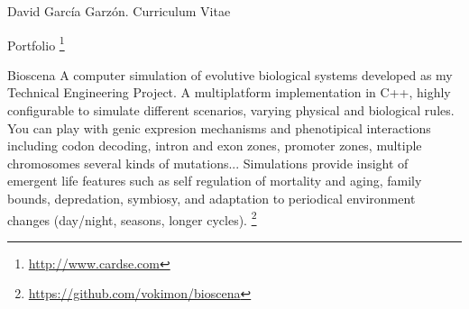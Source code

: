 \documentclass{article}
\begin{document}
\begin{cv}{David García Garzón. Curriculum Vitae}
\begin{cvlist}{Portfolio}
\footnote{\href{http://www.cardse.com}{http://www.cardse.com}}
\item[Bioscena]
A computer simulation of evolutive biological systems developed as my Technical Engineering Project. A multiplatform implementation in C++, highly configurable to simulate different scenarios, varying physical and biological rules. You can play with genic expresion mechanisms and phenotipical interactions including codon decoding, intron and exon zones, promoter zones, multiple chromosomes several kinds of mutations... Simulations provide insight of emergent life features such as self regulation of mortality and aging, family bounds, depredation, symbiosy, and adaptation to periodical environment changes (day/night, seasons, longer cycles). 
\footnote{\href{https://github.com/vokimon/bioscena}{https://github.com/vokimon/bioscena}}

\end{cvlist}


\vspace{2cm}

\end{cv}
\end{document}
